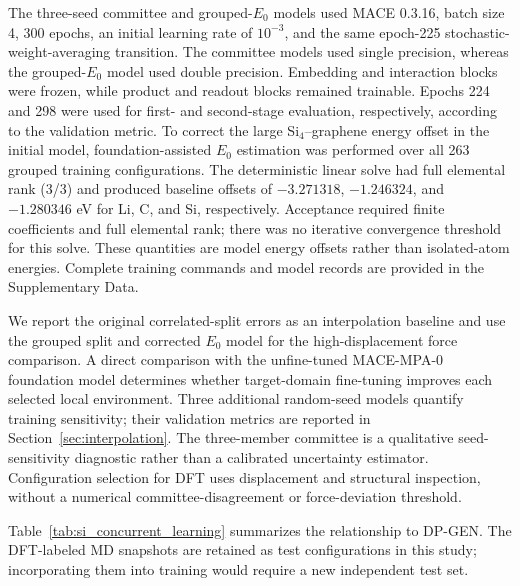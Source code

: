 \documentclass[12pt]{article}
\begin{document}
The three-seed committee and grouped-$E_0$ models used MACE 0.3.16, batch size 4, 300 epochs, an initial learning rate of $10^{-3}$, and the same epoch-225 stochastic-weight-averaging transition. The committee models used single precision, whereas the grouped-$E_0$ model used double precision. Embedding and interaction blocks were frozen, while product and readout blocks remained trainable. Epochs 224 and 298 were used for first- and second-stage evaluation, respectively, according to the validation metric. To correct the large Si$_4$--graphene energy offset in the initial model, foundation-assisted $E_0$ estimation was performed over all 263 grouped training configurations. The deterministic linear solve had full elemental rank (3/3) and produced baseline offsets of $-3.271318$, $-1.246324$, and $-1.280346$ eV for Li, C, and Si, respectively. Acceptance required finite coefficients and full elemental rank; there was no iterative convergence threshold for this solve. These quantities are model energy offsets rather than isolated-atom energies. Complete training commands and model records are provided in the Supplementary Data.

We report the original correlated-split errors as an interpolation baseline and use
the grouped split and corrected $E_0$ model for the high-displacement force
comparison. A direct comparison with the unfine-tuned MACE-MPA-0 foundation
model determines whether target-domain fine-tuning improves each selected local
environment. Three additional random-seed models quantify training sensitivity;
their validation metrics are reported in Section~\ref{sec:interpolation}. The
three-member committee is a qualitative seed-sensitivity diagnostic rather than
a calibrated uncertainty estimator. Configuration selection for DFT uses
displacement and structural inspection, without a numerical
committee-disagreement or force-deviation threshold.

Table~\ref{tab:si_concurrent_learning} summarizes the relationship to DP-GEN.
The DFT-labeled MD snapshots are retained as test configurations in this study;
incorporating them into training would require a new independent test set.


\end{document}
